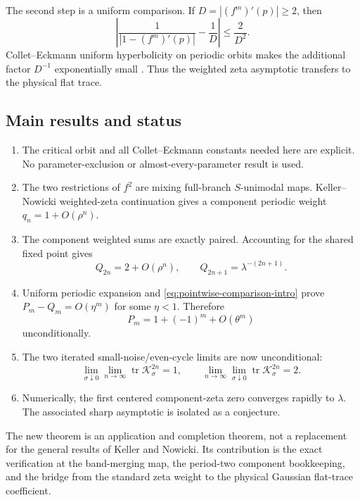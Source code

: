 \documentclass[11pt]{article}
\theoremstyle{definition}
\theoremstyle{remark}
\newcommand{\tr}{\operatorname{tr}}
\newcommand{\cK}{\mathcal K}
\begin{document}
The second step is a uniform comparison.  If
$D=|(f^m)'(p)|\ge2$, then
\begin{equation}\label{eq:pointwise-comparison-intro}
 \left|
 \frac1{|1-(f^m)'(p)|}-\frac1D
 \right|
 \le\frac{2}{D^2}.
\end{equation}
Collet--Eckmann uniform hyperbolicity on periodic orbits makes the additional
factor $D^{-1}$ exponentially small \citep{Nowicki1988}.  Thus the weighted
zeta asymptotic transfers to the physical flat trace.

\subsection*{Main results and status}

\begin{enumerate}[label=\textbf{R\arabic*.},leftmargin=3.2em]
 \item The critical orbit and all Collet--Eckmann constants needed here are
 explicit.  No parameter-exclusion or almost-every-parameter result is used.

 \item The two restrictions of $f^2$ are mixing full-branch $S$-unimodal
 maps.  Keller--Nowicki weighted-zeta continuation gives a component periodic
 weight $q_n=1+O(\rho^n)$.

 \item The component weighted sums are exactly paired.  Accounting for the
 shared fixed point gives
 \[
  Q_{2n}=2+O(\rho^n),
  \qquad Q_{2n+1}=\lambda^{-(2n+1)}.
 \]

 \item Uniform periodic expansion and \eqref{eq:pointwise-comparison-intro}
 prove $P_m-Q_m=O(\eta^m)$ for some $\eta<1$.  Therefore
 \[
  P_m=1+(-1)^m+O(\theta^m)
 \]
 unconditionally.

 \item The two iterated small-noise/even-cycle limits are now unconditional:
 \[
  \lim_{\sigma\downarrow0}\lim_{n\to\infty}
  \tr\cK_\sigma^{2n}=1,
  \qquad
  \lim_{n\to\infty}\lim_{\sigma\downarrow0}
  \tr\cK_\sigma^{2n}=2.
 \]

 \item Numerically, the first centered component-zeta zero converges rapidly
 to $\lambda$.  The associated sharp asymptotic is isolated as a conjecture.
\end{enumerate}

The new theorem is an application and completion theorem, not a replacement
for the general results of Keller and Nowicki.  Its contribution is the exact
verification at the band-merging map, the period-two component bookkeeping,
and the bridge from the standard zeta weight to the physical Gaussian
flat-trace coefficient.
\end{document}
